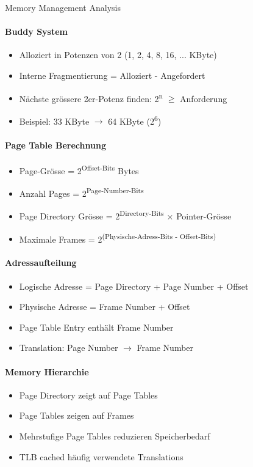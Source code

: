 \begin{KR}{Memory Management Analysis}
    \paragraph{Buddy System}
    \begin{itemize}
        \item Alloziert in Potenzen von 2 (1, 2, 4, 8, 16, ... KByte)
        \item Interne Fragmentierung = Alloziert - Angefordert
        \item Nächste grössere 2er-Potenz finden: 2\textsuperscript{n} $\geq$ Anforderung
        \item Beispiel: 33 KByte $\rightarrow$ 64 KByte (2\textsuperscript{6})
    \end{itemize}
    
    \paragraph{Page Table Berechnung}
    \begin{itemize}
        \item Page-Grösse = 2\textsuperscript{Offset-Bits} Bytes
        \item Anzahl Pages = 2\textsuperscript{Page-Number-Bits}
        \item Page Directory Grösse = 2\textsuperscript{Directory-Bits} × Pointer-Grösse
        \item Maximale Frames = 2\textsuperscript{(Physische-Adress-Bits - Offset-Bits)}
    \end{itemize}
    
    \paragraph{Adressaufteilung}
    \begin{itemize}
        \item Logische Adresse = Page Directory + Page Number + Offset
        \item Physische Adresse = Frame Number + Offset
        \item Page Table Entry enthält Frame Number
        \item Translation: Page Number $\rightarrow$ Frame Number
    \end{itemize}
    
    \paragraph{Memory Hierarchie}
    \begin{itemize}
        \item Page Directory zeigt auf Page Tables
        \item Page Tables zeigen auf Frames
        \item Mehrstufige Page Tables reduzieren Speicherbedarf
        \item TLB cached häufig verwendete Translations
    \end{itemize}
\end{KR}

